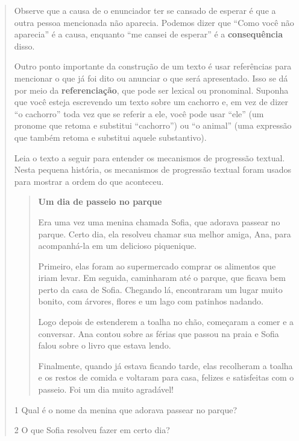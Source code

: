 \begin{quote}
{Observe que a causa de o enunciador ter se cansado de esperar é que a outra pessoa mencionada não aparecia. Podemos dizer que “Como você não aparecia” é a causa, enquanto “me cansei de esperar” é a \textbf{consequência} disso.

Outro ponto importante da construção de um texto é usar referências para
mencionar o que já foi dito ou anunciar o que será apresentado. Isso se dá por meio
da \textbf{referenciação}, que pode ser lexical ou pronominal. Suponha que você esteja escrevendo um
texto sobre um cachorro e, em vez de dizer “o cachorro” toda vez que
se referir a ele, você pode usar “ele” (um pronome que retoma e substitui “cachorro”) ou “o animal” (uma expressão que também retoma e substitui aquele substantivo).}



Leia o texto a seguir para entender os mecanismos de progressão textual.
Nesta pequena história, os mecanismos de progressão textual foram usados para
mostrar a ordem do que aconteceu.

\begin{quote}
\textbf{Um dia de passeio no parque}

Era uma vez uma menina chamada Sofia, que adorava passear no parque.
Certo dia, ela resolveu chamar sua melhor amiga, Ana, para
acompanhá-la em um delicioso piquenique.

Primeiro, elas foram ao supermercado comprar os alimentos que iriam
levar. Em seguida, caminharam até o parque, que ficava bem perto da casa
de Sofia. Chegando lá, encontraram um lugar muito bonito, com árvores,
flores e um lago com patinhos nadando.

Logo depois de estenderem a toalha no chão, começaram a comer e a
conversar. Ana contou sobre as férias que passou na praia e Sofia
falou sobre o livro que estava lendo.

Finalmente, quando já estava ficando tarde, elas recolheram a toalha e
os restos de comida e voltaram para casa, felizes e satisfeitas com o
passeio. Foi um dia muito agradável!

\end{quote}


\num{1} Qual é o nome da menina que adorava passear no parque?



\num{2} O que Sofia resolveu fazer em certo dia?




\end{quote}
